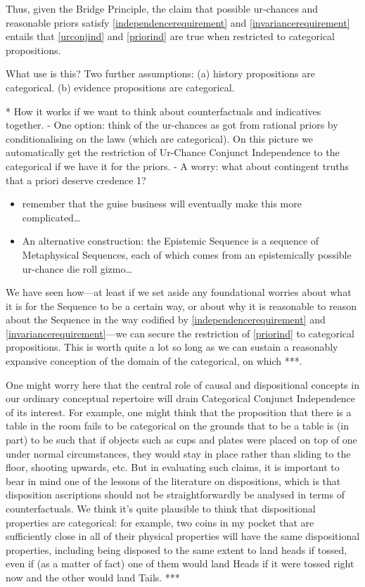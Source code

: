 \documentclass[If.tex]{subfiles}
\begin{document}
Thus, given the Bridge Principle, the claim that possible ur-chances and reasonable priors satisfy \ref{independencerequirement} and \ref{invariancerequirement} entails that \ref{urconjind} and \ref{priorind} are true when restricted to categorical propositions.  

What use is this?  Two further assumptions: (a) history propositions are categorical.  (b) evidence propositions are categorical.  

* How it works if we want to think about counterfactuals and indicatives together.  
	- One option: think of the ur-chances as got from rational priors by conditionalising on the laws (which are categorical).  On this picture we automatically get the restriction of Ur-Chance Conjunct Independence to the categorical if we have it for the priors.  
	- A worry: what about contingent truths that a priori deserve credence 1?  

\begin{itemize}
	\item
  remember that the guise business will eventually make this more
  complicated\ldots{}
\item
  An alternative construction: the Epistemic Sequence is a sequence of
  Metaphysical Sequences, each of which comes from an epistemically
  possible ur-chance die roll gizmo\ldots{}
\end{itemize}

We have seen how---at least if we set aside any foundational worries about what it is for the Sequence to be a certain way, or about why it is reasonable to reason about the Sequence in the way codified by \ref{independencerequirement} and \ref{invariancerequirement}---we can secure the restriction of \ref{priorind} to categorical propositions.  This is worth quite a lot so long as we can sustain a reasonably expansive conception of the domain of the categorical, on which ***.  

One might worry here that the central role of causal and dispositional concepts in our ordinary conceptual repertoire will drain Categorical Conjunct Independence of its interest.  For example, one might think that the proposition that there is a table in the room fails to be categorical on the grounds that to be a table is (in part) to be such that if objects such as cups and plates were placed on top of one under normal circumstances, they would stay in place rather than sliding to the floor, shooting upwards, etc.  But in evaluating such claims, it is important to bear in mind one of the lessons of the literature on dispositions, which is that disposition ascriptions should not be straightforwardly be analysed in terms of counterfactuals.  We think it's quite plausible to think that dispositional properties are categorical: for example, two coins in my pocket that are sufficiently close in all of their physical properties will have the same dispositional properties, including being disposed to the same extent to land heads if tossed, even if (as a matter of fact) one of them would land Heads if it were tossed right now and the other would land Tails.  ***
\end{document}
